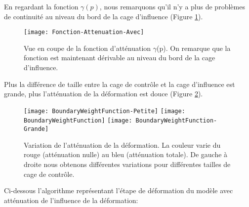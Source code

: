 En regardant la fonction $\gamma(p)$, nous remarquons qu'il n'y a plus de
problèmes de continuité au niveau du bord de la cage d'influence (Figure
\ref{MELAtL}).

\begin{figure}[ht]
\begin{center}
\texttt{[image: Fonction-Attenuation-Avec]}

\caption[Fonction d'atténuation $\gamma$(p)] {Vue en coupe de la fonction
d'atténuation $\gamma$(p). On remarque que la fonction est maintenant
dérivable au niveau du bord de la cage d'influence.}

\label{MELAtL}

\end{center}
\end{figure}

Plus la différence de taille entre la cage de contrôle et la cage d'influence
est grande, plus l'atténuation de la déformation est douce (Figure
\ref{MELBou}).

\begin{figure}[ht]
  \begin{center}
    \texttt{[image: BoundaryWeightFunction-Petite]}
    \texttt{[image: BoundaryWeightFunction]}
    \texttt{[image: BoundaryWeightFunction-Grande]}

    \caption[Variation de l'atténuation de la déformation] {Variation de
l'atténuation de la déformation. La couleur varie du rouge (atténuation nulle)
au bleu (atténuation totale). De gauche à droite nous obtenons différentes
variations pour différentes tailles de cage de contrôle.}

    \label{MELBou}
  \end{center}
\end{figure}

Ci-dessous l'algorithme représentant l'étape de déformation du modèle avec
atténuation de l'influence de la déformation: \\

 \\

